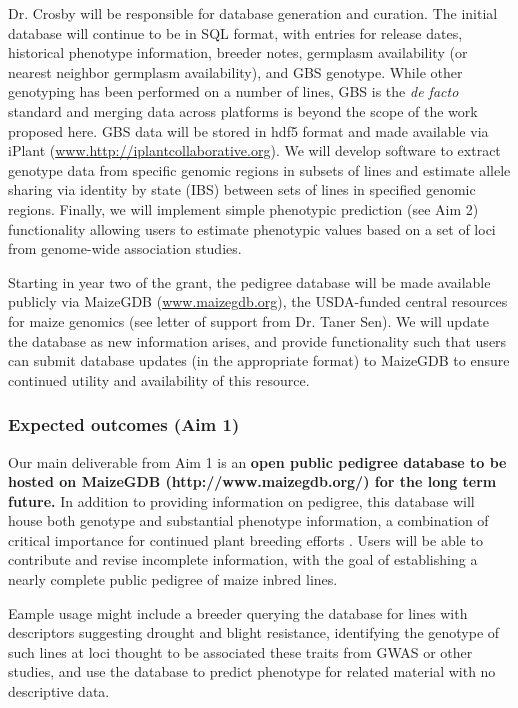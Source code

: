 \documentclass[12pt]{article}
\begin{document}
Dr. Crosby will be responsible for database generation and curation.
The initial database will continue to be in SQL format, with entries for release dates, historical phenotype information, breeder notes, germplasm availability (or nearest neighbor germplasm availability), and GBS genotype.  
While other genotyping has been performed on a number of lines, GBS is the \emph{de facto} standard \citep{romay2013comprehensive} and merging data across platforms is beyond the scope of the work proposed here. 
GBS data will be stored in hdf5 format and made available via iPlant (\url{www.http://iplantcollaborative.org}).
We will develop software to extract genotype data from specific genomic regions in subsets of lines and estimate allele sharing via identity by state (IBS) between sets of lines in specified genomic regions.
Finally, we will implement simple phenotypic prediction (see Aim 2) functionality allowing users to estimate phenotypic values based on a set of loci from genome-wide association studies.

Starting in year two of the grant, the pedigree database will be made available publicly via MaizeGDB (\url{www.maizegdb.org}), the USDA-funded central resources for maize genomics (see letter of support from Dr. Taner Sen).
We will update the database as new information arises, and provide functionality such that users can submit database updates (in the appropriate format) to MaizeGDB to ensure continued utility and availability of this resource.

\subsubsection*{Expected outcomes (Aim 1)}
Our main deliverable from Aim 1 is an \textbf{open public pedigree database to be hosted on MaizeGDB (http://www.maizegdb.org/) for the long term future.} 
In addition to providing information on pedigree, this database will house both genotype and substantial phenotype information, a combination of critical importance for continued plant breeding efforts \citep{zamir2013have}.
Users will be able to contribute and revise incomplete information, with the goal of establishing a nearly complete public pedigree of maize inbred lines.   

Eample usage might include a breeder querying the database for lines with descriptors suggesting drought and blight resistance, identifying the genotype of such lines at loci thought to be associated these traits from GWAS or other studies, and use the database to predict phenotype for related material with no descriptive data.
\end{document}

